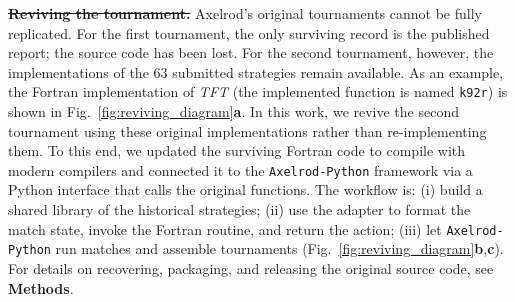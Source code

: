\documentclass{article}
\newcommand{\TFT}{\emph{TFT}}
\newcommand{\AXL}{\texttt{Axelrod-Python}}
\providecommand{\DIFdeltex}[1]{{\protect\color{red}\sout{#1}}}                      %
\providecommand{\DIFdelbegin}{} %
\providecommand{\DIFdelend}{} %
\providecommand{\DIFdel}[1]{\texorpdfstring{\DIFdeltex{#1}}{}} %
\newcommand{\DIFscaledelfig}{0.5}
\newlength{\DIFdelgraphicswidth} %
\newlength{\DIFdelgraphicsheight} %
\newcommand{\DIFdelincludegraphics}[2][]{%
\sbox{\DIFdelgraphicsbox}{\DIFOincludegraphics[#1]{#2}}%
\settoboxwidth{\DIFdelgraphicswidth}{\DIFdelgraphicsbox} %
\settoboxtotalheight{\DIFdelgraphicsheight}{\DIFdelgraphicsbox} %
\scalebox{\DIFscaledelfig}{%
\parbox[b]{\DIFdelgraphicswidth}{\usebox{\DIFdelgraphicsbox}\\[-\baselineskip] \rule{\DIFdelgraphicswidth}{0em}}\llap{\resizebox{\DIFdelgraphicswidth}{\DIFdelgraphicsheight}{%
\setlength{\unitlength}{\DIFdelgraphicswidth}%
\begin{picture}(1,1)%
\thicklines\linethickness{2pt} %
{\color[rgb]{1,0,0}\put(0,0){\framebox(1,1){}}}%
{\color[rgb]{1,0,0}\put(0,0){\line( 1,1){1}}}%
{\color[rgb]{1,0,0}\put(0,1){\line(1,-1){1}}}%
\end{picture}%
}\hspace*{3pt}}} %
} %
\DeclareRobustCommand{\DIFdelbegin}{\DIFOdelbegin \let\includegraphics\DIFdelincludegraphics} %
\DeclareRobustCommand{\DIFdelend}{\DIFOaddend \let\includegraphics\DIFOincludegraphics} %
\begin{document}
\DIFdelbegin \textbf{\DIFdel{Reviving the tournament.}}
\DIFdelend Axelrod's original tournaments cannot be fully replicated. For the first
tournament, the only surviving record is the published report; the source code
has been lost. For the second tournament, however, the implementations of the 63
submitted strategies remain available. As an example, the Fortran implementation
of \TFT{} (the implemented function is named \texttt{k92r}) is shown in
Fig.~\ref{fig:reviving_diagram}\textbf{a}. In this work, we revive the second
tournament using these original implementations rather than re-implementing
them. To this end, we updated the surviving Fortran code to compile with modern
compilers and connected it to the \AXL{} framework via a Python interface that
calls the original functions. The workflow is: (i) build a shared library of the
historical strategies; (ii) use the adapter to format the match state, invoke
the Fortran routine, and return the action; (iii) let \AXL{} run matches and
assemble tournaments (Fig.~\ref{fig:reviving_diagram}\textbf{b},\textbf{c}). For
details on recovering, packaging, and releasing the original source code, see
\textbf{Methods}.
\end{document}

